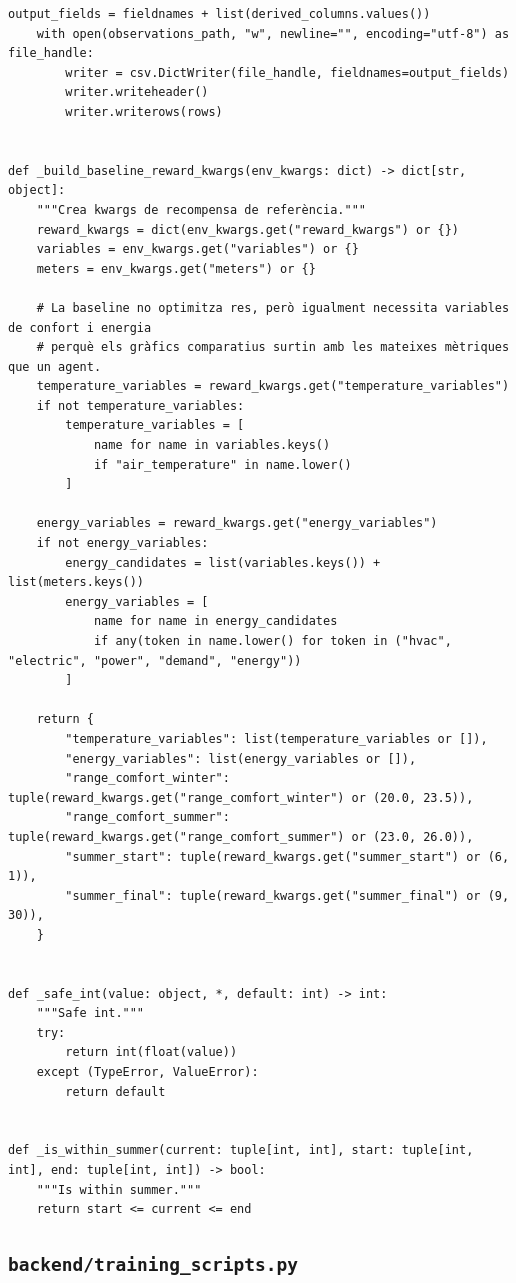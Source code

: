 \documentclass[10pt,a4paper]{article}
\begin{document}
\begin{lstlisting}[style=studioPython,caption={backend/simular\_entorn\_backend.py},label={lst:backend-simular-entorn-backend-py}]
    output_fields = fieldnames + list(derived_columns.values())
    with open(observations_path, "w", newline="", encoding="utf-8") as file_handle:
        writer = csv.DictWriter(file_handle, fieldnames=output_fields)
        writer.writeheader()
        writer.writerows(rows)


def _build_baseline_reward_kwargs(env_kwargs: dict) -> dict[str, object]:
    """Crea kwargs de recompensa de referència."""
    reward_kwargs = dict(env_kwargs.get("reward_kwargs") or {})
    variables = env_kwargs.get("variables") or {}
    meters = env_kwargs.get("meters") or {}

    # La baseline no optimitza res, però igualment necessita variables de confort i energia
    # perquè els gràfics comparatius surtin amb les mateixes mètriques que un agent.
    temperature_variables = reward_kwargs.get("temperature_variables")
    if not temperature_variables:
        temperature_variables = [
            name for name in variables.keys()
            if "air_temperature" in name.lower()
        ]

    energy_variables = reward_kwargs.get("energy_variables")
    if not energy_variables:
        energy_candidates = list(variables.keys()) + list(meters.keys())
        energy_variables = [
            name for name in energy_candidates
            if any(token in name.lower() for token in ("hvac", "electric", "power", "demand", "energy"))
        ]

    return {
        "temperature_variables": list(temperature_variables or []),
        "energy_variables": list(energy_variables or []),
        "range_comfort_winter": tuple(reward_kwargs.get("range_comfort_winter") or (20.0, 23.5)),
        "range_comfort_summer": tuple(reward_kwargs.get("range_comfort_summer") or (23.0, 26.0)),
        "summer_start": tuple(reward_kwargs.get("summer_start") or (6, 1)),
        "summer_final": tuple(reward_kwargs.get("summer_final") or (9, 30)),
    }


def _safe_int(value: object, *, default: int) -> int:
    """Safe int."""
    try:
        return int(float(value))
    except (TypeError, ValueError):
        return default


def _is_within_summer(current: tuple[int, int], start: tuple[int, int], end: tuple[int, int]) -> bool:
    """Is within summer."""
    return start <= current <= end
\end{lstlisting}


\subsection{\texorpdfstring{\texttt{backend/training\_scripts.py}}{backend/training\_scripts.py}}
\end{document}
